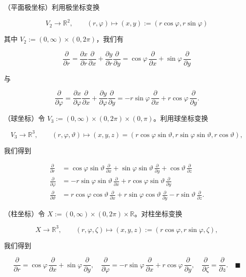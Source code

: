 \begin{example}

\begin{items}
\item

（平面极坐标）利用极坐标变换

\[
V_{2} \to \mathbb{R}^{2}, \qquad (r,\varphi) \mapsto (x,y) := (r\cos\varphi, r\sin\varphi)
\]

其中 $ V_{2} := (0,\infty)\times(0,2\pi) $，我们有

\[
\frac{\partial}{\partial r} = \frac{\partial x}{\partial r}\frac{\partial}{\partial x} + \frac{\partial y}{\partial r}\frac{\partial}{\partial y} = \cos\varphi\,\frac{\partial}{\partial x} + \sin\varphi\,\frac{\partial}{\partial y}
\]

与

\[
\frac{\partial}{\partial\varphi} = \frac{\partial x}{\partial\varphi}\frac{\partial}{\partial x} + \frac{\partial y}{\partial\varphi}\frac{\partial}{\partial y} = -r\sin\varphi\,\frac{\partial}{\partial x} + r\cos\varphi\,\frac{\partial}{\partial y} .
\]
\item

（球坐标）令 $ V_{3} := (0,\infty)\times(0,2\pi)\times(0,\pi) $。利用球坐标变换

\[
V_{3} \to \mathbb{R}^{3}, \qquad (r,\varphi,\vartheta) \mapsto (x,y,z) = (r\cos\varphi\sin\vartheta, r\sin\varphi\sin\vartheta, r\cos\vartheta) ,
\]

我们得到

\begin{equation*}
\begin{aligned}
\frac{\partial}{\partial r} &= \cos\varphi\sin\vartheta\,\frac{\partial}{\partial x} + \sin\varphi\sin\vartheta\,\frac{\partial}{\partial y} + \cos\vartheta\,\frac{\partial}{\partial z} \\ \frac{\partial}{\partial\varphi} &= -r\sin\varphi\sin\vartheta\,\frac{\partial}{\partial x} + r\cos\varphi\sin\vartheta\,\frac{\partial}{\partial y} \\ \frac{\partial}{\partial\vartheta} &= r\cos\varphi\cos\vartheta\,\frac{\partial}{\partial x} + r\sin\varphi\cos\vartheta\,\frac{\partial}{\partial y} - r\sin\vartheta\,\frac{\partial}{\partial z} .
\end{aligned}
\end{equation*}
\item

（柱坐标）令 $ X := (0,\infty)\times(0,2\pi)\times\mathbb{R} $。对柱坐标变换

\[
X \to \mathbb{R}^{3}, \qquad (r,\varphi,\zeta) \mapsto (x,y,z) := (r\cos\varphi, r\sin\varphi, \zeta) ,
\]

我们得到

\[
\frac{\partial}{\partial r} = \cos\varphi\,\frac{\partial}{\partial x} + \sin\varphi\,\frac{\partial}{\partial y}, \quad \frac{\partial}{\partial\varphi} = -r\sin\varphi\,\frac{\partial}{\partial x} + r\cos\varphi\,\frac{\partial}{\partial y}, \quad \frac{\partial}{\partial\zeta} = \frac{\partial}{\partial z} .\quad\blacksquare
\]
\end{items}

\end{example}

